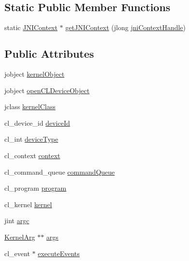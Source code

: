 \subsection*{Static Public Member Functions}
\begin{DoxyCompactItemize}
\item 
static \hyperlink{class_j_n_i_context}{J\-N\-I\-Context} $\ast$ \hyperlink{class_j_n_i_context_acfd6efcf587c0e51bdcc672666a23ed4}{get\-J\-N\-I\-Context} (jlong \hyperlink{aparapi_8cpp_a0040273c7bfca0b191a4ad266d28545d}{jni\-Context\-Handle})
\end{DoxyCompactItemize}
\subsection*{Public Attributes}
\begin{DoxyCompactItemize}
\item 
jobject \hyperlink{class_j_n_i_context_a27e7d5b89e4e4859d15cfc9735e9fdcc}{kernel\-Object}
\item 
jobject \hyperlink{class_j_n_i_context_aecb814e1a3214de3d8f1fc09d93422d6}{open\-C\-L\-Device\-Object}
\item 
jclass \hyperlink{class_j_n_i_context_af91be73a2ebe19dfc194ab58cd9575a9}{kernel\-Class}
\item 
cl\-\_\-device\-\_\-id \hyperlink{class_j_n_i_context_ac9637e5eb4a4de90a76b7a05f1c31882}{device\-Id}
\item 
cl\-\_\-int \hyperlink{class_j_n_i_context_a81fbc7bacb606c79e64a1e03344eb6f3}{device\-Type}
\item 
cl\-\_\-context \hyperlink{class_j_n_i_context_ad405fe75428f606a24260f22a30a4914}{context}
\item 
cl\-\_\-command\-\_\-queue \hyperlink{class_j_n_i_context_af052389a1503633d129ba0a98a8ac94b}{command\-Queue}
\item 
cl\-\_\-program \hyperlink{class_j_n_i_context_a118c4c5f280cb563e4f11727a5fd5664}{program}
\item 
cl\-\_\-kernel \hyperlink{class_j_n_i_context_a845480606129985917deb32c968c5fcd}{kernel}
\item 
jint \hyperlink{class_j_n_i_context_a2a7cb340b07bdc6e1ec3dbee96632747}{argc}
\item 
\hyperlink{class_kernel_arg}{Kernel\-Arg} $\ast$$\ast$ \hyperlink{class_j_n_i_context_ab0dac9ea15c8025e6da69390ee70622c}{args}
\item 
cl\-\_\-event $\ast$ \hyperlink{class_j_n_i_context_aa38ade97cd8becec5edb404d961c6df9}{execute\-Events}
$$
\end{DoxyCompactItemize}
